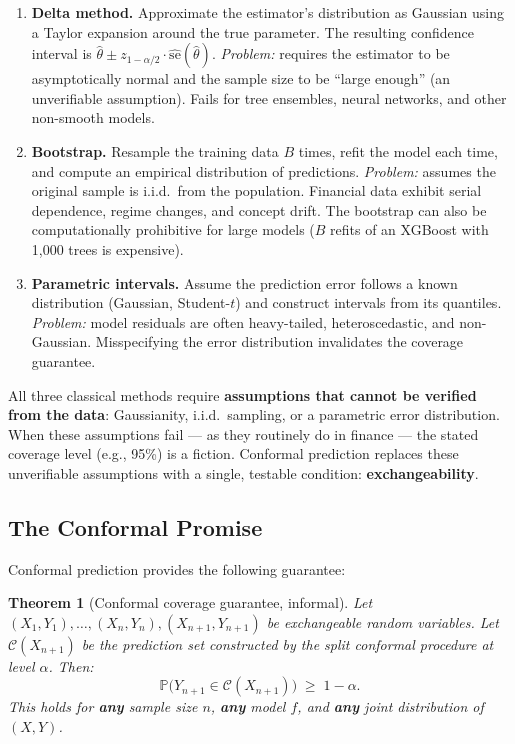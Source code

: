 \documentclass[11pt, a4paper]{article}
\theoremstyle{definition}
\theoremstyle{plain}
\newtheorem{theorem}{Theorem}[section]
\theoremstyle{remark}
\newcommand{\PV}{\mathbb{P}}
\newcommand{\Ccal}{\mathcal{C}}
\begin{document}
\begin{enumerate}
    \item \textbf{Delta method.}
    Approximate the estimator's distribution as Gaussian using a Taylor expansion
    around the true parameter.
    The resulting confidence interval is
    $\hat{\theta} \pm z_{1-\alpha/2} \cdot \widehat{\mathrm{se}}(\hat{\theta})$.
    \emph{Problem:} requires the estimator to be asymptotically normal and the
    sample size to be ``large enough'' (an unverifiable assumption).
    Fails for tree ensembles, neural networks, and other non-smooth models.

    \item \textbf{Bootstrap.}
    Resample the training data $B$ times, refit the model each time, and compute
    an empirical distribution of predictions.
    \emph{Problem:} assumes the original sample is i.i.d.\ from the population.
    Financial data exhibit serial dependence, regime changes, and concept drift.
    The bootstrap can also be computationally prohibitive for large models ($B$
    refits of an XGBoost with 1{,}000 trees is expensive).

    \item \textbf{Parametric intervals.}
    Assume the prediction error follows a known distribution (Gaussian, Student-$t$)
    and construct intervals from its quantiles.
    \emph{Problem:} model residuals are often heavy-tailed, heteroscedastic, and
    non-Gaussian.
    Misspecifying the error distribution invalidates the coverage guarantee.
\end{enumerate}

\begin{keyidea}
All three classical methods require \textbf{assumptions that cannot be verified
from the data}:
Gaussianity, i.i.d.\ sampling, or a parametric error distribution.
When these assumptions fail --- as they routinely do in finance --- the stated
coverage level (e.g., 95\%) is a fiction.
Conformal prediction replaces these unverifiable assumptions with a single,
testable condition: \textbf{exchangeability}.
\end{keyidea}

\subsection{The Conformal Promise}

Conformal prediction provides the following guarantee:

\begin{theorem}[Conformal coverage guarantee, informal]\label{thm:coverage-informal}
Let $(X_1, Y_1), \ldots, (X_n, Y_n), (X_{n+1}, Y_{n+1})$ be exchangeable random
variables.
Let $\Ccal(X_{n+1})$ be the prediction set constructed by the split conformal
procedure at level $\alpha$.
Then:
\begin{equation}\label{eq:coverage}
    \PV\bigl(Y_{n+1} \in \Ccal(X_{n+1})\bigr) \;\geq\; 1 - \alpha.
\end{equation}
This holds for \textbf{any} sample size $n$, \textbf{any} model $f$, and
\textbf{any} joint distribution of $(X, Y)$.
\end{theorem}
\end{document}

